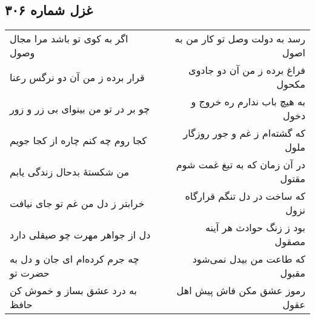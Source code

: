 \begin{center}
\section*{غزل شماره ۳۰۶}
\label{sec:sh306}
\begin{longtable}{l p{0.5cm} r}
اگر به کوی تو باشد مرا مجال وصول
&&
رسد به دولت وصل تو کار من به اصول
\\
قرار برده ز من آن دو نرگس رعنا
&&
فراغ برده ز من آن دو جادوی مکحول
\\
چو بر در تو من بینوای بی زر و زور
&&
به هیچ باب ندارم ره خروج و دخول
\\
کجا روم چه کنم چاره از کجا جویم
&&
که گشته‌ام ز غم و جور روزگار ملول
\\
من شکستهٔ بدحال زندگی یابم
&&
در آن زمان که به تیغ غمت شوم مقتول
\\
خرابتر ز دل من غم تو جای نیافت
&&
که ساخت در دل تنگم قرارگاه نزول
\\
دل از جواهر مهرت چو صیقلی دارد
&&
بود ز زنگ حوادث هر آینه مصقول
\\
چه جرم کرده‌ام ای جان و دل به حضرت تو
&&
که طاعت من بیدل نمی‌شود مقبول
\\
به درد عشق بساز و خموش کن حافظ
&&
رموز عشق مکن فاش پیش اهل عقول
\\
\end{longtable}
\end{center}

